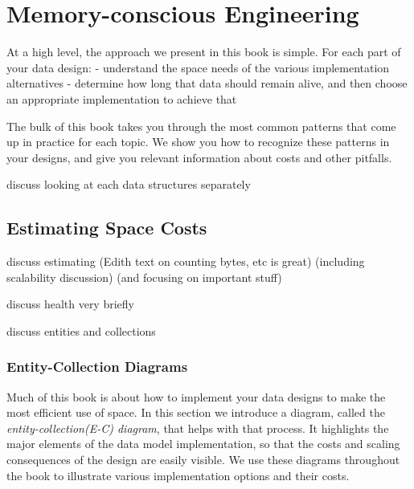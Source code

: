 \section{Memory-conscious Engineering}



At a high level, the approach we present in this book is simple. For each part of your data design:
- understand the space needs of the various implementation alternatives
- determine how long that data should remain alive, and then choose an appropriate implementation to achieve that

The bulk of this book takes you through the most common patterns that come up in
practice for each topic. We show you how to recognize these patterns in your
designs, and give you relevant information about costs and other pitfalls.

discuss looking at each data structures separately

\subsection{Estimating Space Costs}

discuss estimating (Edith text on counting bytes, etc is great) (including
scalability discussion) (and focusing on important stuff)

discuss health very briefly

discuss entities and collections

\subsubsection{Entity-Collection Diagrams}

Much of this book is about how to implement your data designs to make the most
efficient use of space. In this section we introduce a diagram, called the
\emph{entity-collection(E-C) diagram}, that helps with that process. It
highlights the major elements of the data model implementation, so that the
costs and scaling consequences of the design are easily visible. We use these
diagrams throughout the book to illustrate various implementation options and
their costs.

